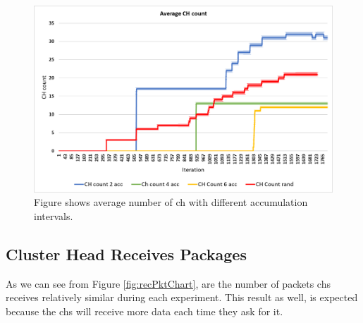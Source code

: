 \documentclass[USenglish]{uit-thesis}
\begin{document}

\begin{figure} [ht]
\centering
\includegraphics[width=\textwidth]{CH_count_stdev.png}
\caption{Figure shows average number of \gls{ch} with different accumulation intervals.}
\label{fig:chCountChart}
\end{figure}


\newpage

\subsection{Cluster Head Receives Packages}

As we can see from Figure \ref{fig:recPktChart}, are the number of packets \glspl{ch} receives relatively similar during each experiment. This result as well, is expected because the \glspl{ch} will receive more data each time they ask for it.

\end{document}
